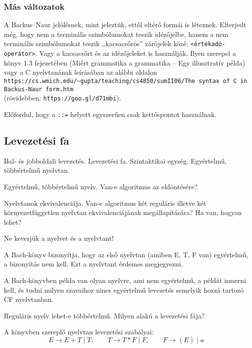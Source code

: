 \documentclass[a4paper]{article}
\begin{document}
\subsubsection{Más változatok}

A Backus--Naur jelölésnek, mint jeleztük, ettől eltérő formái is
léteznek. Elterjedt még, hogy nem a terminális szimbólumokat teszik
idézőjelbe, hanem a nem terminális szimbólumokat teszik ,,kacsacsőrös''
zárójelek közé: \verb+<értékadó-operátor>+. Vagy a kacsacsőrt és az
idézőjeleket is használják. Ilyen szerepel a könyv 1.3 fejezetében (Miért
grammatika a grammatika -- Egy illusztratív példa) vagy a C nyelvtanának
leírásában az alábbi oldalon\\
{\small
\verb+https://cs.wmich.edu/~gupta/teaching/cs4850/sumII06/The syntax of C in Backus-Naur form.htm+
}\\
(rövidebben: \verb+https://goo.gl/d71mbi+).

Előfordul, hogy a \verb+::=+ helyett egyszerűen csak kettőspontot használnak. 



\subsection{Levezetési fa}

Bal- és jobboldali levezetés.
Levezetési fa. Szintaktikai egység.
Egyértelmű, többértelmű nyelvtan.

Egyértelmű, többértelmű nyelv. Van-e algoritmus az eldöntésére?

Nyelvtanok ekvivalenciája.
Van-e algoritmus két reguláris illetve két környezetfüggetlen nyelvtan
ekvivalenciájának megállapítására? Ha van, hogyan lehet?

Ne keverjük a nyelvet és a nyelvtant!

A Bach-könyv bizonyítja, hogy az első nyelvtan (amiben E, T, F van)
egyértelmű, a bizonyítás nem kell. Ezt a nyelvtant érdemes megjegyezni.

A Bach-könyvben példa van olyan nyelvre, ami nem egyértelmű, a példát
ismerni kell, és tudni milyen szavaihoz nincs egyértelmű levezetés
semelyik hozzá tartozó CF nyelvtanban.

Reguláris nyelv lehet-e többértelmű. Milyen alakú a levezetési fája?

A könyvben szereplő nyelvtan levezetési szabályai:
\begin{equation}
    E \rightarrow E+T \mid T,\qquad T \rightarrow T*F \mid F,
    \qquad F \rightarrow (E) \mid a
    \label{eq:expr_rules}
\end{equation}
\end{document}

